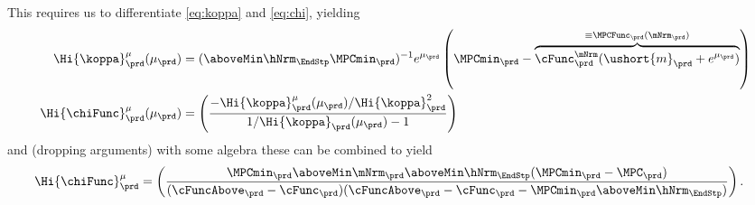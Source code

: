 This requires us to differentiate \eqref{eq:koppa} and \eqref{eq:chi}, yielding
\begin{equation}\begin{gathered}\begin{aligned}
      \Hi{\koppa}_{\prd}^{\mu}(\mu_{\prd})   & = (\aboveMin \hNrm_{\EndStp} \MPCmin_{\prd})^{-1}e^{\mu_{\prd}}\left(\MPCmin_{\prd}-\overbrace{\cFunc^{\mNrm}_{\prd}(\ushort{m}_{\prd}+e^{\mu_{\prd}})}^{\equiv \MPCFunc_{\prd}(\mNrm_{\prd})}\right)  \label{eq:koppaPrime}
      \\ \Hi{\chiFunc}_{\prd}^{\mu}(\mu_{\prd})  & = \left(\frac{-\Hi{\koppa}_{\prd}^{\mu}(\mu_{\prd})/\Hi{\koppa}_{\prd}^{2}}{1/\Hi{\koppa}_{\prd}(\mu_{\prd})-1}\right)
    \end{aligned}\end{gathered}\end{equation}
and (dropping arguments) with some algebra these can be combined to yield
\begin{equation}\begin{gathered}\begin{aligned}
      \Hi{\chiFunc}_{\prd}^{\mu}  & = \left(\frac{\MPCmin_{\prd} \aboveMin \mNrm_{\prd} \aboveMin \hNrm_{\EndStp} (\MPCmin_{\prd}-\MPC_{\prd})}
        {(\cFuncAbove_{\prd}-\cFunc_{\prd})(\cFuncAbove_{\prd}-\cFunc_{\prd} - \MPCmin_{\prd} \aboveMin \hNrm_{\EndStp})}\right).
    \end{aligned}\end{gathered}\end{equation}

